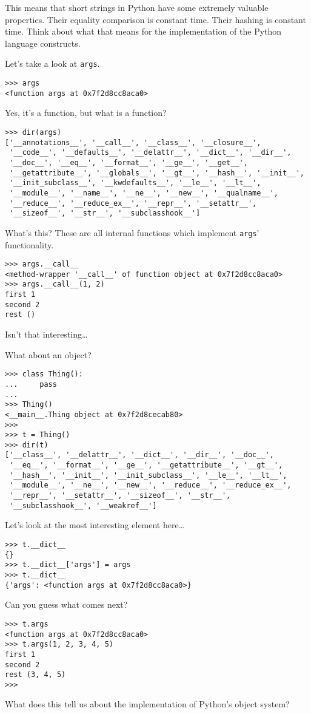 \documentclass[11pt]{article}
\begin{document}
This means that short strings in Python have some extremely valuable
properties. Their equality comparison is constant time. Their
hashing is constant time. Think about what that means for the
implementation of the Python language constructs.

Let's take a look at \texttt{args}.
\begin{verbatim}
>>> args
<function args at 0x7f2d8cc8aca0>
\end{verbatim}
Yes, it's a function, but what is a function?
\begin{verbatim}
>>> dir(args)
['__annotations__', '__call__', '__class__', '__closure__',
 '__code__', '__defaults__', '__delattr__', '__dict__', '__dir__',
 '__doc__', '__eq__', '__format__', '__ge__', '__get__',
 '__getattribute__', '__globals__', '__gt__', '__hash__', '__init__',
 '__init_subclass__', '__kwdefaults__', '__le__', '__lt__',
 '__module__', '__name__', '__ne__', '__new__', '__qualname__',
 '__reduce__', '__reduce_ex__', '__repr__', '__setattr__',
 '__sizeof__', '__str__', '__subclasshook__']
\end{verbatim}
What's this? These are all internal functions which implement \texttt{args}'
functionality.
\begin{verbatim}
>>> args.__call__
<method-wrapper '__call__' of function object at 0x7f2d8cc8aca0>
>>> args.__call__(1, 2)
first 1
second 2
rest ()
\end{verbatim}
Isn't that interesting\ldots{}

What about an object?
\begin{verbatim}
>>> class Thing():
...     pass
... 
>>> Thing()
<__main__.Thing object at 0x7f2d8cecab80>
>>> 
>>> t = Thing()
>>> dir(t)
['__class__', '__delattr__', '__dict__', '__dir__', '__doc__',
 '__eq__', '__format__', '__ge__', '__getattribute__', '__gt__',
 '__hash__', '__init__', '__init_subclass__', '__le__', '__lt__',
 '__module__', '__ne__', '__new__', '__reduce__', '__reduce_ex__',
 '__repr__', '__setattr__', '__sizeof__', '__str__',
 '__subclasshook__', '__weakref__']
\end{verbatim}
Let's look at the most interesting element here\ldots{}
\begin{verbatim}
>>> t.__dict__
{}
>>> t.__dict__['args'] = args
>>> t.__dict__
{'args': <function args at 0x7f2d8cc8aca0>}
\end{verbatim}
Can you guess what comes next?
\begin{verbatim}
>>> t.args
<function args at 0x7f2d8cc8aca0>
>>> t.args(1, 2, 3, 4, 5)
first 1
second 2
rest (3, 4, 5)
>>> 
\end{verbatim}
What does this tell us about the implementation of Python's object
system?
\end{document}
